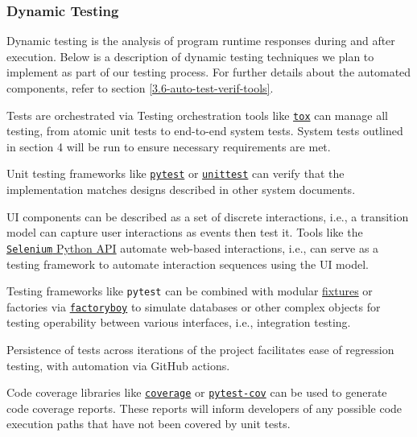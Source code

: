 \documentclass[12pt, titlepage]{article}
\begin{document}
\subsubsection{Dynamic Testing}
Dynamic testing is the analysis of program runtime responses during and after execution. Below is a description of dynamic testing techniques we plan to implement as part of our testing process. For further details about the automated components, refer to section \ref{3.6-auto-test-verif-tools}.

\begin{description}[style=unboxed,leftmargin=0cm]
  \item[System Testing] Tests are orchestrated via Testing orchestration tools like \href{https://tox.wiki/}{\texttt{tox}} can manage all testing, from atomic unit tests to end-to-end system tests. System tests outlined in section 4 will be run to ensure necessary requirements are met.
  \item[Unit Testing] Unit testing frameworks like \href{https://docs.pytest.org/en/stable/}{\texttt{pytest}} or \href{https://docs.python.org/3/library/unittest}{\texttt{unittest}} can verify that the implementation matches designs described in other system documents.
  \item[User Interface Testing] UI components can be described as a set of discrete interactions, i.e., a transition model can capture user interactions as events then test it. Tools like the \href{https://selenium-python.readthedocs.io/}{\texttt{Selenium} Python API} automate web-based interactions, i.e., can serve as a testing framework to automate interaction sequences using the UI model.
  \item[Integration Testing] Testing frameworks like \texttt{pytest} can be combined with modular \href{https://docs.pytest.org/explanation/fixtures.html}{fixtures} or factories via \href{https://factoryboy.readthedocs.io/}{\texttt{factoryboy}} to simulate databases or other complex objects for testing operability between various interfaces, i.e., integration testing.
  \item[Regression Testing] Persistence of tests across iterations of the project facilitates ease of regression testing, with automation via GitHub actions.
  \item[Coverage Testing] Code coverage libraries like \href{https://coverage.readthedocs.io/en/7.6.4/}{\texttt{coverage}} or \href{https://pypi.org/project/pytest-cov/}{\texttt{pytest-cov}} can be used to generate code coverage reports. These reports will inform developers of any possible code execution paths that have not been covered by unit tests.
\end{description}
\end{document}
